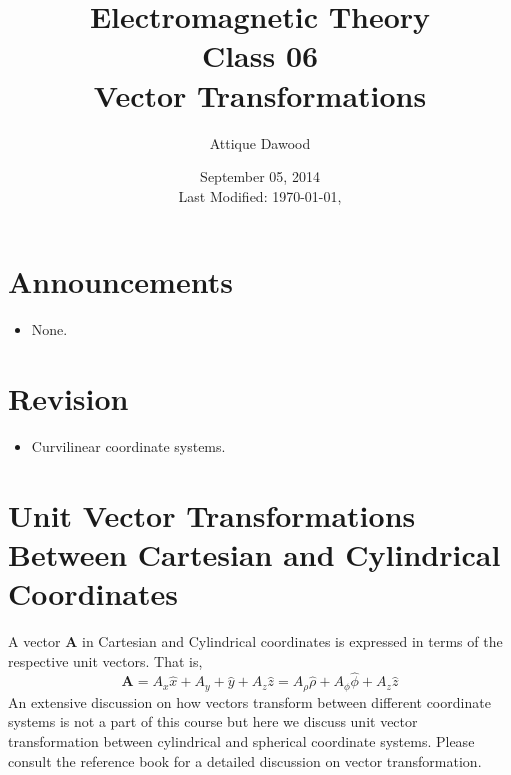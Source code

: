 \documentclass[12pt,a4paper]{article}
\title{Electromagnetic Theory\\Class 06\\Vector Transformations}
\author{Attique Dawood}
\date{September 05, 2014\\[0.2cm] Last Modified: \today, \currenttime}
\begin{document}
\maketitle
\section{Announcements}
\begin{itemize}
\item None.
\end{itemize}
\section{Revision}
\begin{itemize}
\item Curvilinear coordinate systems.
\end{itemize}
\section{Unit Vector Transformations Between Cartesian and Cylindrical Coordinates}
A vector \textbf{A} in Cartesian and Cylindrical coordinates is expressed in terms of the respective unit vectors. That is,
\begin{equation}
\textbf{A}=A_x\hat x+A_y+\hat y+A_z\hat z=A_{\rho}\hat \rho+A_{\phi}\hat \phi+A_z\hat z
\end{equation}
An extensive discussion on how vectors transform between different coordinate systems is not a part of this course but here we discuss unit vector transformation between cylindrical and spherical coordinate systems. Please consult the reference book \cite[Chapter 2]{Sadiku} for a detailed discussion on vector transformation.
\end{document}
